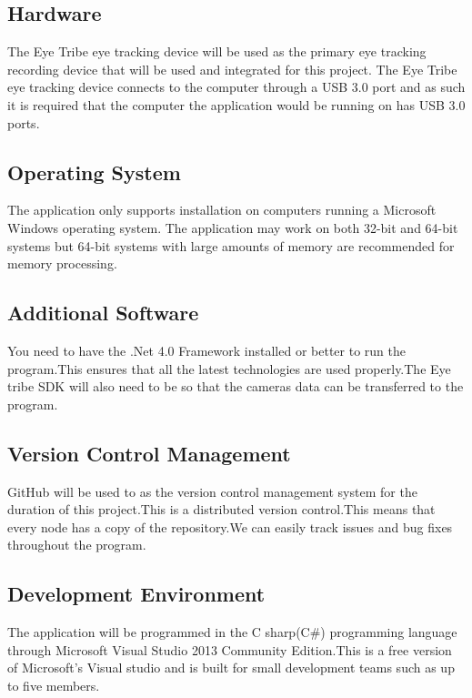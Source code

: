 \subsection{Hardware}
The Eye Tribe eye tracking device will be used as the primary eye tracking recording device that will be used  and integrated for this project. The Eye Tribe eye tracking device  connects to the computer through a USB 3.0 port and as such it is required that the computer the application would be running on has USB 3.0 ports. 
\subsection{Operating System}
The application only supports installation on computers running a Microsoft Windows operating system. The application may work on both 32-bit and 64-bit systems but 64-bit systems with large amounts of memory are recommended for memory processing. 
\subsection{Additional Software}
You need to have the .Net 4.0 Framework installed or better to run the program.This ensures that all the latest technologies are used properly.The Eye tribe SDK will also need to be so that the cameras data can be transferred to the program.
\subsection{Version Control Management}
GitHub will be used to as the version control management system for the duration of this project.This is a distributed version control.This means that every node has a copy of the repository.We can easily track issues and bug fixes throughout the program.
\subsection{Development Environment}
The application will be programmed in the C sharp(C\#) programming language through Microsoft Visual Studio 2013 Community Edition.This is a free version of Microsoft's Visual studio and is built for small development teams such as up to five members.
